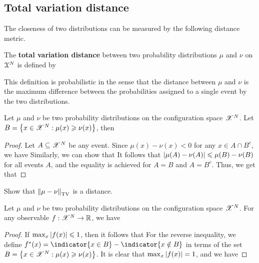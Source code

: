 \documentclass[letterpaper,english,10pt]{article}
\begin{document}
\subsection{Total variation distance}
The closeness of two distributions can be measured by the following distance metric.
\begin{defn}
The \textbf{total variation distance} between two probability distributions $\mu$ and $\nu$ on $\mathcal{X}^N$ is defined by
\end{defn}
This definition is probabilistic in the sense that the distance between $\mu$ and $\nu$ is the maximum difference between the probabilities assigned to a single event by the two distributions. 
\begin{prop}
Let $\mu$ and $\nu$ be two probability distributions on the configuration space $\mathscr{X}^N$. 
Let $B = \left\{x \in \mathscr{X}^N: \mu(x) \geqslant \nu(x)\right\}$, then 
\end{prop}
\begin{proof}
Let $A \subseteq \mathscr{X}^N$ be any event. 
Since $\mu(x)  - \nu(x) < 0$ for any $x \in A\cap B^c$, we have 
Similarly, we can show that 
It follows that $\left\lvert\mu(A)-\nu(A)\right\rvert \leqslant  \mu(B) - \nu(B)$ for all events $A$, 
and the equality is achieved for $A = B$ and $A = B^c$. 
Thus, we get that 
\end{proof}
\begin{exerc}
Show that $\left\lVert\mu-\nu\right\rVert_{\text{TV}}$ is a distance.  
\end{exerc}
\begin{prop}
Let $\mu$ and $\nu$ be two probability distributions on the configuration space $\mathscr{X}^N$. 
For any observable $f: \mathscr{X}^N \to \mathbb{R}$, we have 
\end{prop}
\begin{proof}
If $\max_x\left\lvert f(x)\right\rvert \leqslant 1$, then it follows that 
For the reverse inequality, we define $f^{\ast}(x) = \indicator{x \in B}-\indicator{x \notin B}$ in terms of the set $B = \left\{x \in \mathscr{X}^N: \mu(x) \geqslant \nu(x)\right\}$. 
It is clear that $\max_x\left\lvert f(x)\right\rvert = 1$, and we have 
\end{proof}
\end{document}
